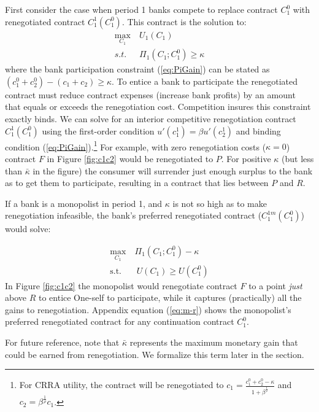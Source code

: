 \documentclass[11pt,english]{article}
\theoremstyle{plain}
\theoremstyle{definition}
\begin{document}
First consider the case when period 1 banks compete to replace contract
$C_{1}^{0}$ with renegotiated contract $C_{1}^{1}(C_{1}^{0})$. This contract is the solution to: 
\begin{align}
\max_{C_{1}} & \ U_{1}(C_{1})\\
s.t. & \ \Pi_{1}(C_{1};C_{1}^{0})\ge\kappa\label{eq:PiGain}
\end{align}
{}where the bank participation constraint (\ref{eq:PiGain}) can be stated
as $(c_{1}^{0}+c_{2}^{0})-(c_{1}+c_{2})\ge\kappa$. To entice a bank
to participate the renegotiated contract must reduce contract expenses (increase bank profits) by an amount that equals or exceeds the
renegotiation cost. Competition insures this constraint exactly
binds. We can solve for an
interior competitive renegotiation contract $C_{1}^{1}(C_{1}^{0})$ using the first-order condition $u'(c_{1}^{1})=\beta u'(c_{2}^{1})$
and binding condition (\ref{eq:PiGain}).\footnote{ For CRRA utility, the contract will be renegotiated to $c_{1}=\frac{c_{1}^{0}+c_{2}^{0}-\kappa}{1+\beta^{\frac{1}{\rho}}}$
and $c_{2}=\beta^{\frac{1}{\rho}}c_{1}$. } For example, with zero renegotiation costs ($\kappa=0$) contract
$F$ in Figure \ref{fig:c1c2} would be renegotiated to $P$. For
positive $\kappa$ (but less than $\bar{\kappa}$ in the figure) the
consumer will surrender just enough surplus to the bank as to get
them to participate, resulting in a contract that lies between $P$
and $R$.

If a bank is a monopolist in period 1, and $\kappa$ is not so high
as to make renegotiation infeasible, the bank's preferred renegotiated contract ($C_{1}^{1m}(C_{1}^{0})$) would solve:

\begin{align}
\max_{C_{1}}\ & \Pi_{1}(C_{1};C_{1}^{0})-\kappa\\
\text{s.t.} & \ U(C_{1})\geq U(C_{1}^{0})\label{eq:ugain}
\end{align}
In Figure \ref{fig:c1c2} the monopolist would renegotiate contract
$F$ to a point \textit{just} above $R$ to entice One-self
to participate, while it captures (practically) all the gains to renegotiation. Appendix equation (\ref{eq:m-r}) shows the monopolist's
preferred renegotiated contract for any continuation contract
$C_{1}^{0}$.


For future reference, note that $\bar{\kappa}$ represents the maximum monetary gain that could be earned from renegotiation. We formalize this term later in the section.
\end{document}
